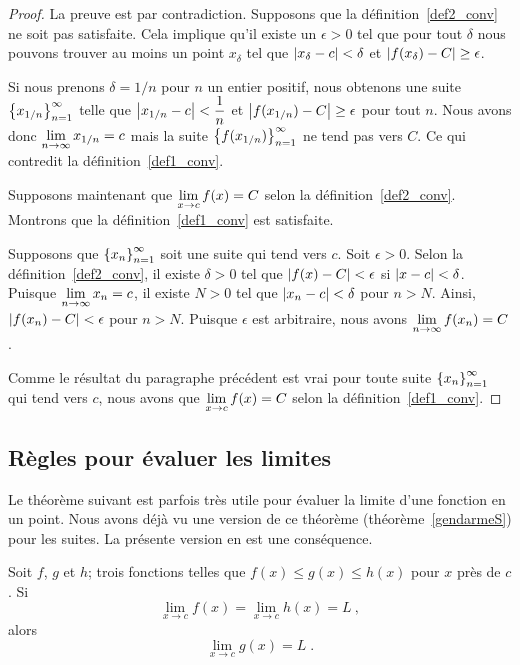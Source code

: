 {\begin{proof}
La preuve est par contradiction.  Supposons que la
définition~\ref{def2_conv} ne soit pas satisfaite.  Cela implique
qu'il existe un $\epsilon >0$ tel que pour tout $\delta$ nous pouvons
trouver au moins un point $x_\delta$ tel que
$\displaystyle \left|x_\delta -c\right| < \delta$ et
$\displaystyle \left|f(x_\delta) -C\right| \geq \epsilon$.

Si nous prenons $\delta = 1/n$ pour $n$ un entier positif, nous
obtenons une
suite $\displaystyle \left\{ x_{1/n} \right\}_{n=1}^\infty$ telle que
$\displaystyle \left|x_{1/n} - c \right| < \frac{1}{n}$ et
$\displaystyle \left|f(x_{1/n}) -C\right| \geq \epsilon$ pour tout $n$.
Nous avons donc $\displaystyle \lim_{n\rightarrow \infty} x_{1/n} = c$ mais
la suite $\displaystyle \left\{ f(x_{1/n}) \right\}_{n=1}^\infty$ ne
tend pas vers $C$.  Ce qui contredit la définition~\ref{def1_conv}.

 Supposons maintenant que
$\displaystyle \lim_{x\rightarrow c} f(x) = C$ selon la
définition~\ref{def2_conv}.  Montrons que la
définition~\ref{def1_conv} est satisfaite.

Supposons que $\displaystyle \left\{ x_n \right\}_{n=1}^\infty$ soit
une suite qui tend vers $c$.  Soit $\epsilon >0$.  Selon la
définition~\ref{def2_conv}, il existe $\delta >0$ tel que
$\displaystyle \left|f(x) -C\right| < \epsilon$ si
$\displaystyle \left|x -c\right| < \delta$.  Puisque
$\displaystyle \lim_{n\rightarrow \infty} x_n = c$, il existe $N>0$
tel que $\displaystyle \left|x_n - c \right| < \delta$ pour $n>N$.
Ainsi,
$\displaystyle \left|f(x_n) -C\right| < \epsilon$ pour $n>N$.  Puisque
$\epsilon$ est arbitraire, nous avons
$\displaystyle \lim_{n\rightarrow \infty} f(x_n) = C$.

Comme le résultat du paragraphe précédent est vrai pour toute suite
$\displaystyle \left\{ x_n \right\}_{n=1}^\infty$ qui tend vers $c$,
nous avons que $\displaystyle \lim_{x\rightarrow c} f(x) = C$ selon la
définition~\ref{def1_conv}.
\end{proof}

\subsection{Règles pour évaluer les limites}

Le théorème suivant est parfois très utile pour évaluer la limite
d'une fonction en un point.  Nous avons déjà vu une version de ce théorème
(théorème~\ref{gendarmeS}) pour les suites.  La présente version
en est une conséquence.

\begin{theorem}
Soit $f$, $g$ et $h$; trois fonctions telles que
$f(x) \leq g(x) \leq h(x)$ pour $x$ près de $c$.  Si
\[
\lim_{x\rightarrow c} f(x) = \lim_{x\rightarrow c} h(x) = L \ ,
\]
alors
\[
\lim_{x\rightarrow c} g(x) = L \; .
\]
\label{gendarmeF}
\end{theorem}

}
